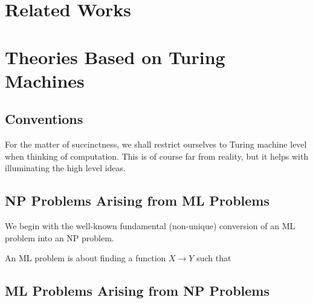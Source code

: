 \documentclass[11pt, oneside]{article}   	%
\theoremstyle{definition}
\begin{document}
\section{Related Works}



\section{Theories Based on Turing Machines}

\subsection{Conventions}

For the matter of succinctness, we shall restrict ourselves to Turing machine level when thinking of computation. This is of course far from reality, but it helps with illuminating the high level ideas.


\subsection{NP Problems Arising from ML Problems}

We begin with the well-known fundamental (non-unique) conversion of an ML problem into an NP problem.

An ML problem is about finding a function $X\to Y$ such that 

\subsection{ML Problems Arising from NP Problems}
\begin{center}
\end{center}
\end{document}
